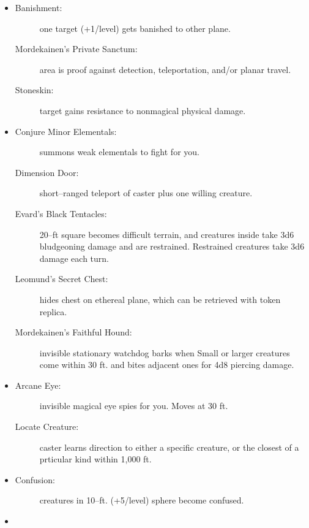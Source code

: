 \documentclass[DIV=14, paper=a4, fontsize=10pt, twocolumn, twoside]{scrartcl}
\begin{document}
\begin{itemize}[align=parleft,labelwidth=1cm]
	\renewcommand{\labelitemi}{Abjur}\item
	\begin{description}
 \item[Banishment:] one target (+1/level) gets banished to other plane.
 \item[Mordekainen’s Private Sanctum:] area is proof against detection, teleportation, and/or planar travel.
 \item[Stoneskin:] target gains resistance to nonmagical physical damage.
\end{description}
\renewcommand{\labelitemi}{Conj}\item
\begin{description}
 \item[Conjure Minor Elementals:] summons weak elementals to fight for you.
 \item[Dimension Door:] short–ranged teleport of caster plus one willing creature.
 \item[Evard’s Black Tentacles:] 20–ft square becomes difficult terrain, and creatures inside take 3d6 bludgeoning damage and are restrained. Restrained creatures take 3d6 damage each turn.
 \item[Leomund’s Secret Chest:] hides chest on ethereal plane, which can be retrieved with token replica.
 \item[Mordekainen’s Faithful Hound:] invisible stationary watchdog barks when Small or larger creatures come within 30 ft. and bites adjacent ones for 4d8 piercing damage.
\end{description}
\renewcommand{\labelitemi}{Div}\item
\begin{description}
 \item[Arcane Eye:] invisible magical eye spies for you. Moves at 30 ft.
 \item[Locate Creature:] caster learns direction to either a specific creature, or the closest of a prticular kind within 1,000 ft.
\end{description}
\renewcommand{\labelitemi}{Ench}\item
\begin{description}
 \item[Confusion:] creatures in 10–ft. (+5/level) sphere become confused.
\end{description}
\renewcommand{\labelitemi}{Evoc}\item
\begin{description}

\end{description}
\end{itemize}
\end{document}
